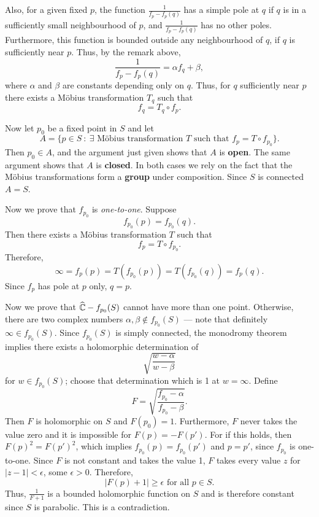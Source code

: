\documentclass[a4paper,11pt]{article}
\begin{document}
\begin{mdframed}[skipbelow=1ex]
  Also, for a given fixed $p$, the function $\frac{1}{f_p - f_p(q)}$
  has a simple pole at $q$ if $q$ is in a sufficiently small
  neighbourhood of $p$, and $\frac{1}{f_p - f_p(q)}$ has no other
  poles.
  Furthermore, this function is bounded outside any neighbourhood of
  $q$, if $q$ is sufficiently near $p$.  Thus, by the remark above,
  $$
  \frac{1}{f_p - f_p(q)} = \alpha f_q + \beta,
  $$
  where $\alpha$ and $\beta$ are constants depending only on $q$.
  Thus, for $q$ sufficiently near $p$ there exists a M\"obius
  transformation $T_q$ such that
  $$
  f_q = T_q \circ f_p.
  $$

  Now let $p_0$ be a fixed point in $S$ and let
  $$
  A = \{ p \in S ~:~ \exists \text{ M\"obius transformation } T
  \text{ such that } f_p = T \circ f_{p_0} \}.
  $$
  Then $p_0 \in A$, and the argument just given shows that $A$ is
  \textbf{open}.  The same argument shows that $A$ is
  \textbf{closed}.  In both cases we rely on the fact that the
  M\"obius transformations form a \textbf{group} under composition.
  Since $S$ is connected $A = S$.

  Now we prove that $f_{p_0}$ is \emph{one-to-one}.  Suppose
  $$
  f_{p_0}(p) = f_{p_0}(q).
  $$
  Then there exists a M\"obius transformation $T$ such that
  $$
  f_p = T \circ f_{p_0}.
  $$
  Therefore,
  $$
  \infty = f_p(p) = T(f_{p_0}(p)) = T(f_{p_0}(q)) = f_p(q).
  $$
  Since $f_p$ has pole at $p$ only, $q = p$.

  Now we prove that $\widehat{{\mathbb C}} - f_{p_0}(S)$ cannot have more
  than one point.  Otherwise, there are two complex numbers $\alpha,
  \beta \notin f_{p_0}(S)$ --- note that definitely $\infty \in
  f_{p_0}(S)$.  Since $f_{p_0}(S)$ is simply connected, the monodromy
  theorem implies there exists a holomorphic determination of 
  $$
  \sqrt{\frac{w-\alpha}{w-\beta}}
  $$
  for $w \in f_{p_0}(S)$; choose that determination which is 1 at $w =
  \infty$.  Define
  $$
  F = \sqrt{\frac{f_{p_0}-\alpha}{f_{p_0}-\beta}}.
  $$
  Then $F$ is holomorphic on $S$ and $F(p_0) = 1$.  Furthermore, $F$
  never takes the value zero and it is impossible for $F(p) =
  -F(p')$.  For if this holds, then $F(p)^2 = F(p')^2$, which implies
  $f_{p_0}(p) = f_{p_0}(p')$ and $p = p'$, since $f_{p_0}$ is
  one-to-one.  Since $F$ is not constant and takes the value 1, $F$
  takes every value $z$ for $|z-1| < \epsilon$, some $\epsilon > 0$.
  Therefore,
  $$
  |F(p) + 1| \ge \epsilon
  \text{ for all } p \in S.
  $$
  Thus, $\frac{1}{F+1}$ is a bounded holomorphic function on $S$ and
  is therefore constant since $S$ is parabolic.  This is a
  contradiction.


\end{mdframed}
\end{document}
